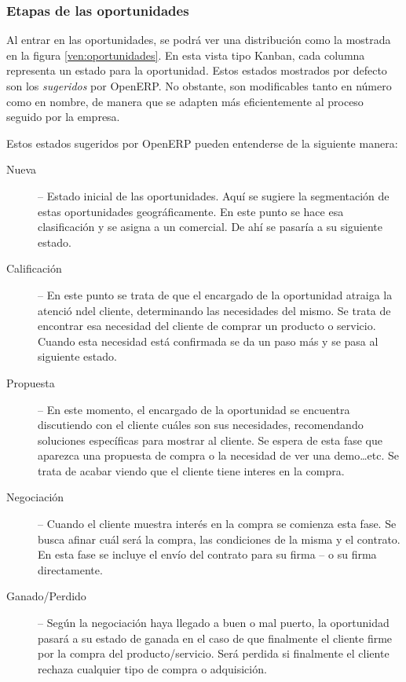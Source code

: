 \subsubsection{Etapas de las oportunidades}
Al entrar en las oportunidades, se podrá ver una distribución como la mostrada en la figura \ref{ven:oportunidades}. En esta vista tipo 
Kanban, cada columna representa un estado para la oportunidad. Estos estados mostrados por defecto son los \emph{sugeridos} por OpenERP. No obstante, son modificables tanto en número como en nombre, de manera que se adapten más eficientemente al proceso seguido por la empresa.

Estos estados sugeridos por OpenERP pueden entenderse de la siguiente manera:

\begin{description}
   \item[Nueva] -- Estado inicial de las oportunidades. Aquí se sugiere la segmentación de estas oportunidades geográficamente. En este
                punto se hace esa clasificación y se asigna a un comercial. De ahí se pasaría a su siguiente estado.
   \item[Calificación] -- En este punto se trata de que el encargado de la oportunidad atraiga la atenció ndel cliente, determinando 
                las necesidades del mismo. Se trata de encontrar esa necesidad del cliente de comprar un producto o servicio. 
                Cuando esta necesidad está confirmada se da un paso más y se pasa al siguiente estado.
   \item[Propuesta] -- En este momento, el encargado de la oportunidad se encuentra discutiendo con el cliente cuáles son sus necesidades,
                recomendando soluciones específicas para mostrar al cliente. Se espera de esta fase que aparezca una propuesta de compra
                o la necesidad de ver una demo\ldots etc. Se trata de acabar viendo que el cliente tiene interes en la compra.
   \item[Negociación] -- Cuando el cliente muestra interés en la compra se comienza esta fase. Se busca afinar cuál será la compra, las
                condiciones de la misma y el contrato. En esta fase se incluye el envío del contrato para su firma -- o su firma      
                directamente.
   \item[Ganado/Perdido] -- Según la negociación haya llegado a buen o mal puerto, la oportunidad pasará a su estado de ganada
                en el caso de que finalmente el cliente firme por la compra del producto/servicio. Será perdida si finalmente el cliente
                rechaza cualquier tipo de compra o adquisición.
\end{description}

